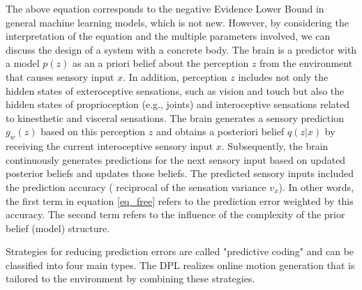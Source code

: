 The above equation corresponds to the negative Evidence Lower Bound in general machine learning models, which is not new. However, by considering the interpretation of the equation and the multiple parameters involved, we can discuss the design of a system with a concrete body. The brain is a predictor with a model $p(z)$ as an a priori belief about the perception $z$ from the environment that causes sensory input $x$. In addition, perception $z$ includes not only the hidden states of exteroceptive sensations, such as vision and touch but also the hidden states of proprioception (e.g., joints) and interoceptive sensations related to kinesthetic and visceral sensations. The brain generates a sensory prediction $g_w(z)$ based on this perception $z$ and obtains a posteriori belief $q(z|x)$ by receiving the current interoceptive sensory input $x$. Subsequently, the brain continuously generates predictions for the next sensory input based on updated posterior beliefs and updates those beliefs. The predicted sensory inputs included the prediction accuracy ( reciprocal of the sensation variance $v_x$). In other words, the first term in equation \ref{eq_free} refers to the prediction error weighted by this accuracy. The second term refers to the influence of the complexity of the prior belief (model) structure.


Strategies for reducing prediction errors are called "predictive coding" and can be classified into four main types. The DPL realizes online motion generation that is tailored to the environment by combining these strategies.


